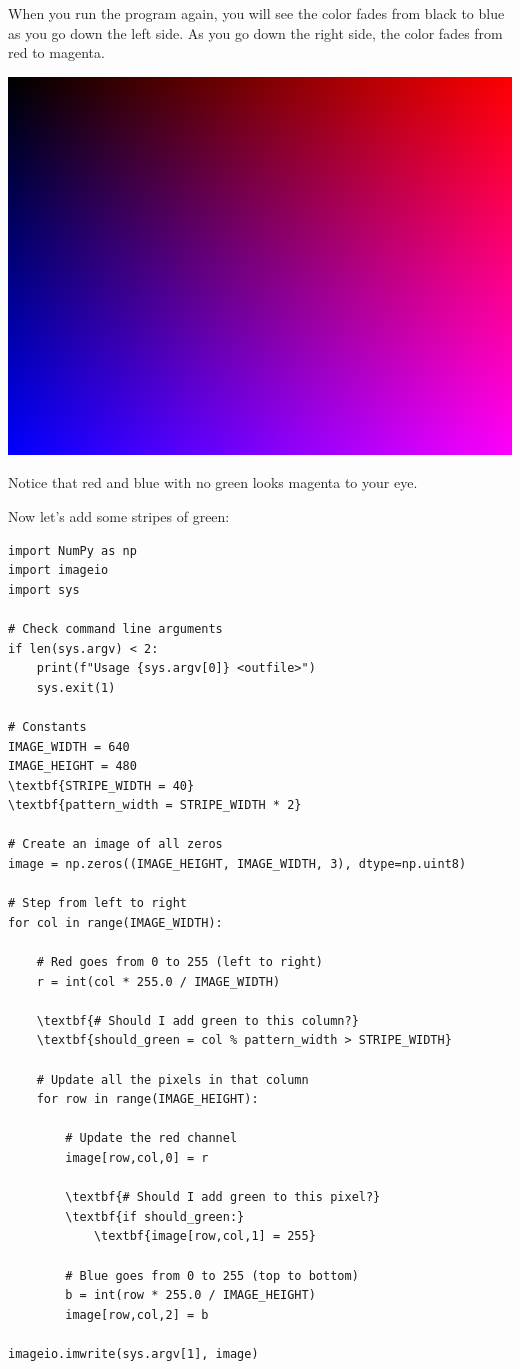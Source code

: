 When you run the program again, you will see the color fades from
black to blue as you go down the left side. As you go down the right
side, the color fades from red to magenta.

\includegraphics[width=0.4\linewidth]{rb.png}

Notice that red and blue with no green looks magenta to your eye.

Now let's add some stripes of green:

\begin{Verbatim}[commandchars=\\\{\}]
import NumPy as np
import imageio
import sys

# Check command line arguments
if len(sys.argv) < 2:
    print(f"Usage {sys.argv[0]} <outfile>")
    sys.exit(1)

# Constants
IMAGE_WIDTH = 640
IMAGE_HEIGHT = 480
\textbf{STRIPE_WIDTH = 40}
\textbf{pattern_width = STRIPE_WIDTH * 2}

# Create an image of all zeros
image = np.zeros((IMAGE_HEIGHT, IMAGE_WIDTH, 3), dtype=np.uint8)

# Step from left to right
for col in range(IMAGE_WIDTH):

    # Red goes from 0 to 255 (left to right)
    r = int(col * 255.0 / IMAGE_WIDTH)

    \textbf{# Should I add green to this column?}
    \textbf{should_green = col % pattern_width > STRIPE_WIDTH}

    # Update all the pixels in that column
    for row in range(IMAGE_HEIGHT):

        # Update the red channel
        image[row,col,0] = r

        \textbf{# Should I add green to this pixel?}
        \textbf{if should_green:}
            \textbf{image[row,col,1] = 255}

        # Blue goes from 0 to 255 (top to bottom)
        b = int(row * 255.0 / IMAGE_HEIGHT)
        image[row,col,2] = b

imageio.imwrite(sys.argv[1], image)
\end{Verbatim}


